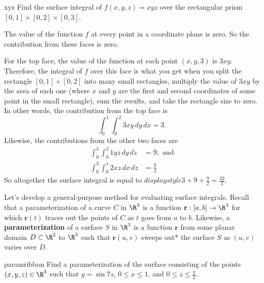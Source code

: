 \documentclass[indent]{watsonbook}
\begin{document}
\begin{example}{}{xyz}
  Find the surface integral of $f(x,y,z) = xyz$ over the rectangular
  prism $[0,1] \times [0,2] \times [0,3]$.
\end{example}

\begin{solution}
  The value of the function $f$ at every point in a coordinate plane
  is zero. So the contribution from these faces is zero.

  For the top face, the value of the function at each point $(x,y,3)$
  is $3xy$. Therefore, the integral of $f$ over this face is what you
  get when you split the rectangle $[0,1] \times [0,2]$ into many
  small rectangles, multiply the value of $3xy$ by the area of each
  one (where $x$ and $y$ are the first and second coordinates of some
  point in the small rectangle), sum the results, and take the
  rectangle size to zero. In other words, the contribution from the
  top face is
  \[
    \int_0^1 \int_0^2 3xy \, {d} y\, {d} x = 3.
  \]
  Likewise, the contributions from the other two faces are
  \begin{align*}
    \int_0^3 \int_0^2 1yz \, {d} y\, {d} z &= 9, \text{ and} \\
    \int_{0}^{3}
    \int_{0}^{1}2xz \, {d} x\,
    {d} z &= \frac{9}{2}
  \end{align*}
  So altogether the surface integral is equal to ${d}isplaystyle{3 + 9 +
    \frac{9}{2}} = \boxed{\frac{33}{2}}$.
\end{solution}

Let's develop a general-purpose method for evaluating surface
integrals. Recall that a parameterization of a curve $C$ in $\R^3$ is
a function $\mathbf{r}: [a,b] \to \R^3$ for which $\mathbf{r}(t)$
traces out the points of $C$ as $t$ goes from $a$ to $b$. Likewise, a
\textbf{parameterization} of a surface $S$ in $\R^3$ is a function
$\mathbf{r}$ from some planar domain $D \subset \R^2$ to $\R^3$ such
that $\mathbf{r}(u,v)$ sweeps out*  the
surface $S$ as $(u,v)$ varies over $D$.

\begin{example}{}{paramribbon}
  Find a parameterization of the surface consisting of the points
  $(x,y,z) \in \R^3$ such that $y = \sin 7z$, $0 \leq x \leq 1$, and
  $0 \leq z \leq \frac{\pi}{2}$.
\end{example}
\end{document}
